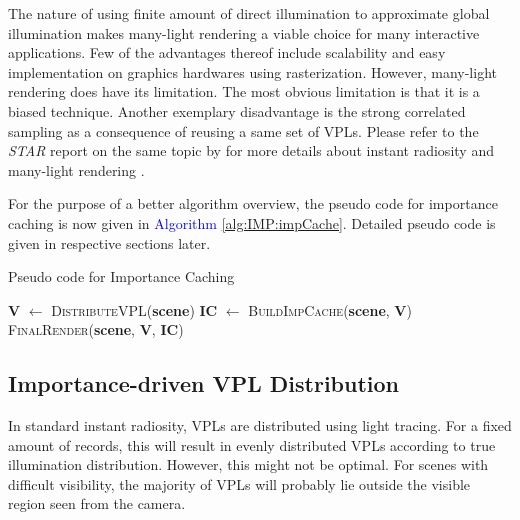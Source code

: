 \documentclass[]{book}
\begin{document}
The nature of using finite amount of direct illumination to approximate global illumination makes many-light rendering a viable choice for many interactive applications.
Few of the advantages thereof include scalability and easy implementation on graphics hardwares using rasterization.
However, many-light rendering does have its limitation.
The most obvious limitation is that it is a biased technique.
Another exemplary disadvantage is the strong correlated sampling as a consequence of reusing a same set of VPLs.
Please refer to the \textit{STAR} report on the same topic by \citeauthor{dachsbacher2014scalable} for more details about instant radiosity and many-light rendering \cite{dachsbacher2014scalable}.

For the purpose of a better algorithm overview, the pseudo code for importance caching is now given in \textcolor{blue}{Algorithm} \ref{alg:IMP:impCache}.
Detailed pseudo code is given in respective sections later.

\begin{algorithm}[b]
	\caption[Importance Caching]{Pseudo code for Importance Caching}
	\label{alg:IMP:impCache}
	\begin{algorithmic}[1]
			\State \textbf{V} $\gets$ \textsc{DistributeVPL}(\textbf{scene})
			\State \textbf{IC} $\gets$ \textsc{BuildImpCache}(\textbf{scene}, \textbf{V})
			\State \textsc{FinalRender}(\textbf{scene}, \textbf{V}, \textbf{IC})
		\EndProcedure
	\end{algorithmic}
\end{algorithm}

\subsection{Importance-driven VPL Distribution}
\label{sec:imp_cache:algorithm:distribute}
In standard instant radiosity, VPLs are distributed using light tracing.
For a fixed amount of records, this will result in evenly distributed VPLs according to true illumination distribution.
However, this might not be optimal.
For scenes with difficult visibility, the majority of VPLs will probably lie outside the visible region seen from the camera.
\end{document}
